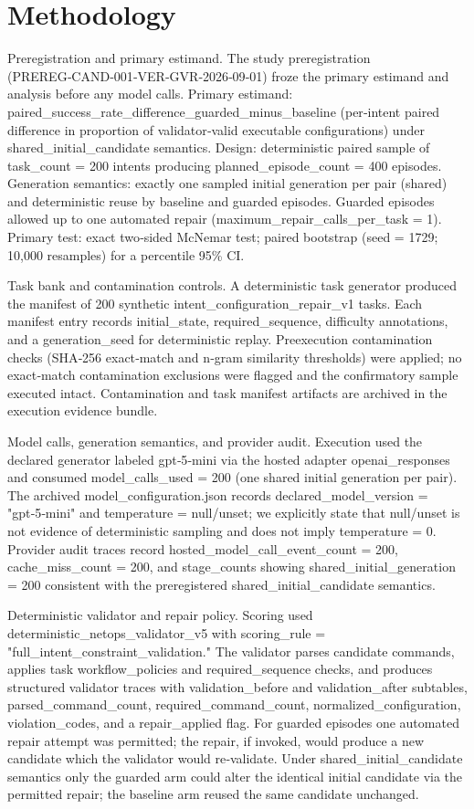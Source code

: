 \documentclass[conference]{IEEEtran}
\begin{document}
\section{Methodology}
Preregistration and primary estimand. The study preregistration (PREREG‑CAND‑001‑VER‑GVR‑2026‑09‑01) froze the primary estimand and analysis before any model calls. Primary estimand: paired\_success\_rate\_difference\_guarded\_minus\_baseline (per‑intent paired difference in proportion of validator‑valid executable configurations) under shared\_initial\_candidate semantics. Design: deterministic paired sample of task\_count = 200 intents producing planned\_episode\_count = 400 episodes. Generation semantics: exactly one sampled initial generation per pair (shared) and deterministic reuse by baseline and guarded episodes. Guarded episodes allowed up to one automated repair (maximum\_repair\_calls\_per\_task = 1). Primary test: exact two‑sided McNemar test; paired bootstrap (seed = 1729; 10,000 resamples) for a percentile 95\% CI.

Task bank and contamination controls. A deterministic task generator produced the manifest of 200 synthetic intent\_configuration\_repair\_v1 tasks. Each manifest entry records initial\_state, required\_sequence, difficulty annotations, and a generation\_seed for deterministic replay. Preexecution contamination checks (SHA‑256 exact‑match and n‑gram similarity thresholds) were applied; no exact‑match contamination exclusions were flagged and the confirmatory sample executed intact. Contamination and task manifest artifacts are archived in the execution evidence bundle.

Model calls, generation semantics, and provider audit. Execution used the declared generator labeled gpt‑5‑mini via the hosted adapter openai\_responses and consumed model\_calls\_used = 200 (one shared initial generation per pair). The archived model\_configuration.json records declared\_model\_version = "gpt‑5‑mini" and temperature = null/unset; we explicitly state that null/unset is not evidence of deterministic sampling and does not imply temperature = 0. Provider audit traces record hosted\_model\_call\_event\_count = 200, cache\_miss\_count = 200, and stage\_counts showing shared\_initial\_generation = 200 consistent with the preregistered shared\_initial\_candidate semantics.

Deterministic validator and repair policy. Scoring used deterministic\_netops\_validator\_v5 with scoring\_rule = "full\_intent\_constraint\_validation." The validator parses candidate commands, applies task workflow\_policies and required\_sequence checks, and produces structured validator traces with validation\_before and validation\_after subtables, parsed\_command\_count, required\_command\_count, normalized\_configuration, violation\_codes, and a repair\_applied flag. For guarded episodes one automated repair attempt was permitted; the repair, if invoked, would produce a new candidate which the validator would re‑validate. Under shared\_initial\_candidate semantics only the guarded arm could alter the identical initial candidate via the permitted repair; the baseline arm reused the same candidate unchanged.
\end{document}
